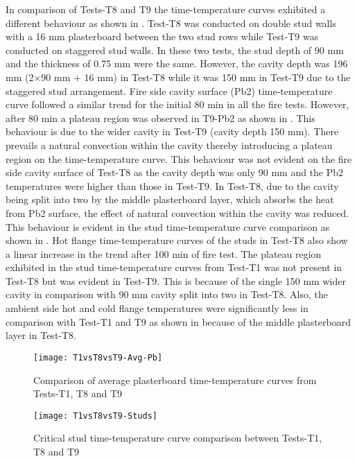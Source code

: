 In comparison of Tests-T8 and T9 the time-temperature curves exhibited a different behaviour as shown in . Test-T8 was conducted on double stud walls with a 16 mm plasterboard between the two stud rows while Test-T9 was conducted on staggered stud walls. In these two tests, the stud depth of 90 mm and the thickness of 0.75 mm were the same. However, the cavity depth was 196 mm (2\(\times\)90 mm \(+\) 16 mm) in Test-T8 while it was 150 mm in Test-T9 due to the staggered stud arrangement. Fire side cavity surface (Pb2) time-temperature curve followed a similar trend for the initial 80 min in all the fire tests. However, after 80 min a plateau region was observed in T9-Pb2 as shown in . This behaviour is due to the wider cavity in Test-T9 (cavity depth 150 mm). There prevails a natural convection within the cavity thereby introducing a plateau region on the time-temperature curve. This behaviour was not evident on the fire side cavity surface of Test-T8 as the cavity depth was only 90 mm and the Pb2 temperatures were higher than those in Test-T9. In Test-T8, due to the cavity being split into two by the middle plasterboard layer, which absorbs the heat from Pb2 surface, the effect of natural convection within the cavity was reduced. This behaviour is evident in the stud time-temperature curve comparison as shown in . Hot flange time-temperature curves of the studs in Test-T8 also show a linear increase in the trend after 100 min of fire test. The plateau region exhibited in the stud time-temperature curves from Test-T1 was not present in Test-T8 but was evident in Test-T9. This is because of the single 150 mm wider cavity in comparison with 90 mm cavity split into two in Test-T8. Also, the ambient side hot and cold flange temperatures were significantly less in comparison with Test-T1 and T9 as shown in  because of the middle plasterboard layer in Test-T8.
\begin{figure}[!htbp]
	\centering
		\texttt{[image: T1vsT8vsT9-Avg-Pb]}  
	\caption{Comparison of average plasterboard time-temperature curves from Tests-T1, T8 and T9}
	\label{fig:T1vsT8vsT9-Avg-Pb}
\end{figure}
\begin{figure}[!htbp]
	\centering
		\texttt{[image: T1vsT8vsT9-Studs]}  
	\caption{Critical stud time-temperature curve comparison between Tests-T1, T8 and T9}
	\label{fig:T1vsT8vsT9-Studs}
\end{figure}
 
